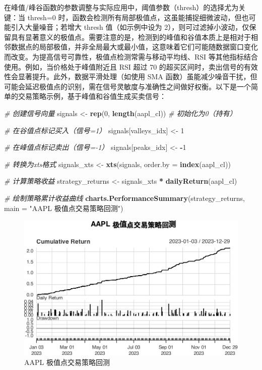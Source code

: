 \documentclass[]{ctexbook}
\newenvironment{Shaded}{\begin{snugshade}}{\end{snugshade}}
\newcommand{\AttributeTok}[1]{\textcolor[rgb]{0.13,0.29,0.53}{#1}}
\newcommand{\CommentTok}[1]{\textcolor[rgb]{0.56,0.35,0.01}{\textit{#1}}}
\newcommand{\DecValTok}[1]{\textcolor[rgb]{0.00,0.00,0.81}{#1}}
\newcommand{\FunctionTok}[1]{\textcolor[rgb]{0.13,0.29,0.53}{\textbf{#1}}}
\newcommand{\NormalTok}[1]{#1}
\newcommand{\OtherTok}[1]{\textcolor[rgb]{0.56,0.35,0.01}{#1}}
\newcommand{\SpecialCharTok}[1]{\textcolor[rgb]{0.81,0.36,0.00}{\textbf{#1}}}
\newcommand{\StringTok}[1]{\textcolor[rgb]{0.31,0.60,0.02}{#1}}
\begin{document}
在峰值/峰谷函数的参数调整与实际应用中，阈值参数（thresh）的选择尤为关键：当 thresh=0 时，函数会检测所有局部极值点，这虽能捕捉细微波动，但也可能引入大量噪音；若增大 thresh 值（如示例中设为 2），则可过滤掉小波动，仅保留具有显著意义的极值点。需要注意的是，检测到的峰值和谷值本质上是相对于相邻数据点的局部极值，并非全局最大或最小值，这意味着它们可能随数据窗口变化而改变。为提高信号可靠性，极值点检测常需与移动平均线、RSI 等其他指标结合使用。例如，当价格处于峰值附近且 RSI 超过 70 的超买区间时，卖出信号的有效性会显著提升。此外，数据平滑处理（如使用 SMA 函数）虽能减少噪音干扰，但可能会延迟极值点的识别，需在信号灵敏度与准确性之间做好权衡。以下是一个简单的交易策略示例，基于峰值和谷值生成买卖信号：

\begin{Shaded}
\begin{Highlighting}[]
\CommentTok{\# 创建信号向量}
\NormalTok{signals }\OtherTok{\textless{}{-}} \FunctionTok{rep}\NormalTok{(}\DecValTok{0}\NormalTok{, }\FunctionTok{length}\NormalTok{(aapl\_cl))  }\CommentTok{\# 初始化为0（持有）}

\CommentTok{\# 在谷值点标记买入（信号=1）}
\NormalTok{signals[valleys\_idx] }\OtherTok{\textless{}{-}} \DecValTok{1}

\CommentTok{\# 在峰值点标记卖出（信号={-}1）}
\NormalTok{signals[peaks\_idx] }\OtherTok{\textless{}{-}} \SpecialCharTok{{-}}\DecValTok{1}

\CommentTok{\# 转换为xts格式}
\NormalTok{signals\_xts }\OtherTok{\textless{}{-}} \FunctionTok{xts}\NormalTok{(signals, }\AttributeTok{order.by =} \FunctionTok{index}\NormalTok{(aapl\_cl))}

\CommentTok{\# 计算策略收益}
\NormalTok{strategy\_returns }\OtherTok{\textless{}{-}}\NormalTok{ signals\_xts }\SpecialCharTok{*} \FunctionTok{dailyReturn}\NormalTok{(aapl\_cl)}

\CommentTok{\# 绘制策略累计收益曲线}
\FunctionTok{charts.PerformanceSummary}\NormalTok{(strategy\_returns, }
                          \AttributeTok{main =} \StringTok{"AAPL 极值点交易策略回测"}\NormalTok{)}
\end{Highlighting}
\end{Shaded}

\begin{figure}
\includegraphics[width=0.9\linewidth]{QuantmodHandbook_files/figure-latex/signal-1} \caption{AAPL 极值点交易策略回测}\label{fig:signal}
\end{figure}
\end{document}
